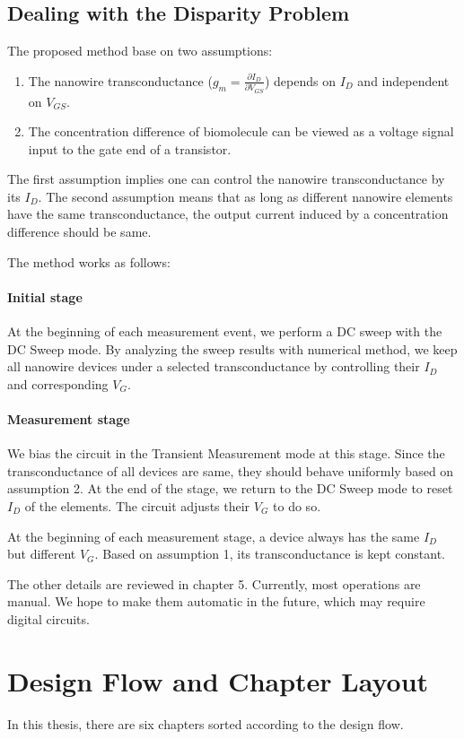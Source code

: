 \subsection*{Dealing with the Disparity Problem} \label{section:twqAssumption}
The proposed method base on two assumptions:
\begin{enumerate}
    \item The nanowire transconductance ($g_m = \frac{\partial I_D}{\partial V_{GS}}$) depends on $I_D$ and independent on $V_{GS}$.
    \item The concentration difference of biomolecule can be viewed as a voltage signal input to the gate end of a transistor.
\end{enumerate}
The first assumption implies one can control the nanowire transconductance by its $I_D$.
The second assumption means that as long as different nanowire elements have the same transconductance, the output current induced by a concentration difference should be same.

The method works as follows:

\paragraph*{Initial stage}
At the beginning of each measurement event, we perform a DC sweep with the DC Sweep mode.
By analyzing the sweep results with numerical method, we keep all nanowire devices under a selected transconductance by controlling their $I_D$ and corresponding $V_G$.

\paragraph*{Measurement stage}
We bias the circuit in the Transient Measurement mode at this stage.
Since the transconductance of all devices are same, they should behave uniformly based on assumption 2.
At the end of the stage, we return to the DC Sweep mode to reset $I_D$ of the elements.
The circuit adjusts their $V_G$ to do so.

At the beginning of each measurement stage, a device always has the same $I_D$ but different $V_G$.
Based on assumption 1, its transconductance is kept constant.


The other details are reviewed in chapter 5.
Currently, most operations are manual.
We hope to make them automatic in the future, which may require digital circuits.

\section{Design Flow and Chapter Layout}
In this thesis, there are six chapters sorted according to the design flow.

